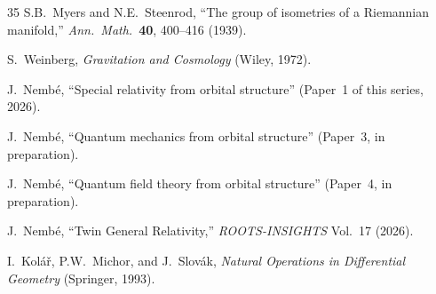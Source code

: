 \documentclass[12pt]{article}
\theoremstyle{plain}
\theoremstyle{definition}
\theoremstyle{remark}
\begin{document}
\begin{thebibliography}{35}
 S.B.~Myers and N.E.~Steenrod, ``The group of isometries of a Riemannian manifold,'' \emph{Ann.\ Math.}\ \textbf{40}, 400--416 (1939).

 S.~Weinberg, \emph{Gravitation and Cosmology} (Wiley, 1972).

 J.~Nemb\'e, ``Special relativity from orbital structure'' (Paper~1 of this series, 2026).

 J.~Nemb\'e, ``Quantum mechanics from orbital structure'' (Paper~3, in preparation).

 J.~Nemb\'e, ``Quantum field theory from orbital structure'' (Paper~4, in preparation).

 J.~Nemb\'e, ``Twin General Relativity,'' \emph{ROOTS-INSIGHTS} Vol.~17 (2026).

 I.~Kol\'a\v{r}, P.W.~Michor, and J.~Slov\'ak, \emph{Natural Operations in Differential Geometry} (Springer, 1993).

\end{thebibliography}
\end{document}
